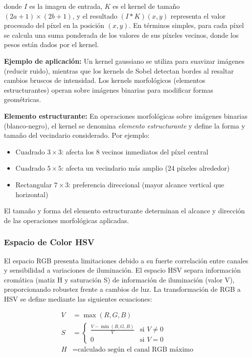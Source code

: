 donde $I$ es la imagen de entrada, $K$ es el kernel de tamaño $(2a+1) \times (2b+1)$, y el resultado $(I \ast K)(x,y)$ representa el valor procesado del píxel en la posición $(x,y)$. En términos simples, para cada píxel se calcula una suma ponderada de los valores de sus píxeles vecinos, donde los pesos están dados por el kernel.

\textbf{Ejemplo de aplicación:} Un kernel gaussiano se utiliza para suavizar imágenes (reducir ruido), mientras que los kernels de Sobel detectan bordes al resaltar cambios bruscos de intensidad. Los kernels morfológicos (elementos estructurantes) operan sobre imágenes binarias para modificar formas geométricas.

\textbf{Elemento estructurante:} En operaciones morfológicas sobre imágenes binarias (blanco-negro), el kernel se denomina \textit{elemento estructurante} y define la forma y tamaño del vecindario considerado. Por ejemplo:
\begin{itemize}
\item Cuadrado $3 \times 3$: afecta los 8 vecinos inmediatos del píxel central
\item Cuadrado $5 \times 5$: afecta un vecindario más amplio (24 píxeles alrededor)
\item Rectangular $7 \times 3$: preferencia direccional (mayor alcance vertical que horizontal)
\end{itemize}

El tamaño y forma del elemento estructurante determinan el alcance y dirección de las operaciones morfológicas aplicadas.

\subsubsection{Espacio de Color HSV}

El espacio RGB presenta limitaciones debido a su fuerte correlación entre canales y sensibilidad a variaciones de iluminación. El espacio HSV separa información cromática (matiz H y saturación S) de información de iluminación (valor V), proporcionando robustez frente a cambios de luz. La transformación de RGB a HSV se define mediante las siguientes ecuaciones:

\begin{align}
V &= \max(R, G, B) \\
S &= \begin{cases}
\frac{V - \min(R,G,B)}{V} & \text{si } V \neq 0 \\
0 & \text{si } V = 0
\end{cases} \\
H &= \text{calculado según el canal RGB máximo}
\end{align}

